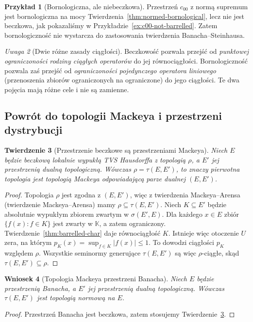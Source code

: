 \documentclass[11pt,a4paper]{article}
\numberwithin{equation}{section}
\theoremstyle{plain}
\newtheorem{twierdzenie}{Twierdzenie}[section]
\newtheorem{wniosek}[twierdzenie]{Wniosek}
\theoremstyle{definition}
\newtheorem{przyklad}[twierdzenie]{Przykład}
\theoremstyle{remark}
\newtheorem{uwaga}[twierdzenie]{Uwaga}
\newcommand{\K}{\mathbb K}
\begin{document}
\begin{przyklad}[Bornologiczna, ale niebeczkowa]
Przestrzeń $c_{00}$ z normą supremum jest bornologiczna
na mocy Twierdzenia~\ref{thm:normed-bornological}, lecz
nie jest beczkowa, jak pokazaliśmy w
Przykładzie~\ref{ex:c00-not-barrelled}.
Zatem bornologiczność nie wystarcza do zastosowania
twierdzenia Banacha--Steinhausa.
\end{przyklad}

\begin{uwaga}[Dwie różne zasady ciągłości]
Beczkowość pozwala przejść od \emph{punktowej ograniczoności
rodziny ciągłych operatorów} do jej równociągłości.
Bornologiczność pozwala zaś przejść od \emph{ograniczoności
pojedynczego operatora liniowego} (przenoszenia zbiorów
ograniczonych na ograniczone) do jego ciągłości.
Te dwa pojęcia mają różne cele i nie są zamienne.
\end{uwaga}

\subsection{Powrót do topologii Mackeya i przestrzeni dystrybucji}

\begin{twierdzenie}[Przestrzenie beczkowe są przestrzeniami Mackeya]
\label{thm:barrelled-mackey}
Niech $E$ będzie beczkową lokalnie wypukłą TVS Hausdorffa
z topologią $\rho$, a $E'$ jej przestrzenią dualną topologiczną.
Wówczas $\rho=\tau(E,E')$, to znaczy pierwotna topologia
jest topologią Mackeya odpowiadającą parze dualnej $(E,E')$.
\end{twierdzenie}
\begin{proof}
Topologia $\rho$ jest zgodna z $(E,E')$, więc z
twierdzenia Mackeya--Arensa
(twierdzenie Mackeya--Arensa) mamy
$\rho\subseteq\tau(E,E')$.
Niech $K\subseteq E'$ będzie absolutnie wypukłym zbiorem
zwartym w $\sigma(E',E)$. Dla każdego $x\in E$
zbiór $\{f(x):f\in K\}$ jest zwarty w $\K$, a zatem
ograniczony. Twierdzenie~\ref{thm:barrelled-char} daje
równociągłość $K$. Istnieje więc otoczenie $U$ zera,
na którym $p_K(x)=\sup_{f\in K}|f(x)|\le1$.
To dowodzi ciągłości $p_K$ względem $\rho$.
Wszystkie seminormy generujące $\tau(E,E')$ są więc
$\rho$-ciągłe, skąd $\tau(E,E')\subseteq\rho$.
\end{proof}

\begin{wniosek}[Topologia Mackeya przestrzeni Banacha]\label{cor:banach-mackey}
Niech $E$ będzie przestrzenią Banacha, a $E'$ jej
przestrzenią dualną topologiczną. Wówczas
$\tau(E,E')$ jest topologią normową na $E$.
\end{wniosek}
\begin{proof}
Przestrzeń Banacha jest beczkowa, zatem stosujemy
Twierdzenie~\ref{thm:barrelled-mackey}.
\end{proof}
\end{document}
